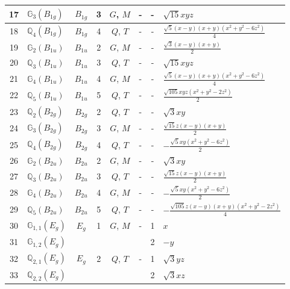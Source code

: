 \documentclass[fleqn,10pt,landscape]{jsarticle}
\begin{document}
\begin{longtable}[l]{clcccccl}
17 & $\mathbb{G}_{3}(B_{1g})$ & $B_{1g}$ & 3 & $G$, $M$ & - & - & $\sqrt{15} x y z$ \\ \hline
18 & $\mathbb{Q}_{4}(B_{1g})$ & $B_{1g}$ & 4 & $Q$, $T$ & - & - & $\frac{\sqrt{5} \left(x - y\right) \left(x + y\right) \left(x^{2} + y^{2} - 6 z^{2}\right)}{4}$ \\ \hline
19 & $\mathbb{G}_{2}(B_{1u})$ & $B_{1u}$ & 2 & $G$, $M$ & - & - & $\frac{\sqrt{3} \left(x - y\right) \left(x + y\right)}{2}$ \\ \hline
20 & $\mathbb{Q}_{3}(B_{1u})$ & $B_{1u}$ & 3 & $Q$, $T$ & - & - & $\sqrt{15} x y z$ \\ \hline
21 & $\mathbb{G}_{4}(B_{1u})$ & $B_{1u}$ & 4 & $G$, $M$ & - & - & $\frac{\sqrt{5} \left(x - y\right) \left(x + y\right) \left(x^{2} + y^{2} - 6 z^{2}\right)}{4}$ \\ \hline
22 & $\mathbb{Q}_{5}(B_{1u})$ & $B_{1u}$ & 5 & $Q$, $T$ & - & - & $\frac{\sqrt{105} x y z \left(x^{2} + y^{2} - 2 z^{2}\right)}{2}$ \\ \hline
23 & $\mathbb{Q}_{2}(B_{2g})$ & $B_{2g}$ & 2 & $Q$, $T$ & - & - & $\sqrt{3} x y$ \\ \hline
24 & $\mathbb{G}_{3}(B_{2g})$ & $B_{2g}$ & 3 & $G$, $M$ & - & - & $\frac{\sqrt{15} z \left(x - y\right) \left(x + y\right)}{2}$ \\ \hline
25 & $\mathbb{Q}_{4}(B_{2g})$ & $B_{2g}$ & 4 & $Q$, $T$ & - & - & $- \frac{\sqrt{5} x y \left(x^{2} + y^{2} - 6 z^{2}\right)}{2}$ \\ \hline
26 & $\mathbb{G}_{2}(B_{2u})$ & $B_{2u}$ & 2 & $G$, $M$ & - & - & $\sqrt{3} x y$ \\ \hline
27 & $\mathbb{Q}_{3}(B_{2u})$ & $B_{2u}$ & 3 & $Q$, $T$ & - & - & $\frac{\sqrt{15} z \left(x - y\right) \left(x + y\right)}{2}$ \\ \hline
28 & $\mathbb{G}_{4}(B_{2u})$ & $B_{2u}$ & 4 & $G$, $M$ & - & - & $- \frac{\sqrt{5} x y \left(x^{2} + y^{2} - 6 z^{2}\right)}{2}$ \\ \hline
29 & $\mathbb{Q}_{5}(B_{2u})$ & $B_{2u}$ & 5 & $Q$, $T$ & - & - & $- \frac{\sqrt{105} z \left(x - y\right) \left(x + y\right) \left(x^{2} + y^{2} - 2 z^{2}\right)}{4}$ \\ \hline
30 & $\mathbb{G}_{1,1}(E_{g})$ & $E_{g}$ & 1 & $G$, $M$ & - & 1 & $x$ \\
31 & $\mathbb{G}_{1,2}(E_{g})$ &  &  &  &  & 2 & $- y$ \\ \hline
32 & $\mathbb{Q}_{2,1}(E_{g})$ & $E_{g}$ & 2 & $Q$, $T$ & - & 1 & $\sqrt{3} y z$ \\
33 & $\mathbb{Q}_{2,2}(E_{g})$ &  &  &  &  & 2 & $\sqrt{3} x z$ \\ \hline

\end{longtable}
\end{document}
